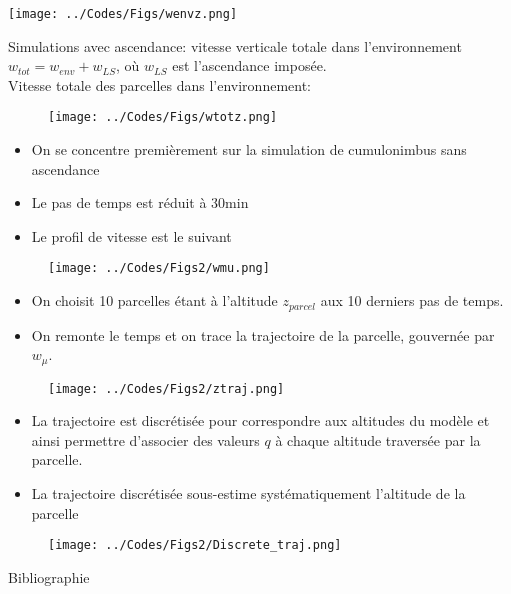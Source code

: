 \documentclass[10pt]{beamer}
\begin{document}
\begin{frame}{\secname}
    \centering
    \texttt{[image: ../Codes/Figs/wenvz.png]}
\end{frame}

\begin{frame}{\secname}
    Simulations avec ascendance: vitesse verticale totale dans l'environnement $w_{tot} = w_{env} + w_{LS}$, où $w_{LS}$ est l'ascendance imposée. \\
    Vitesse totale des parcelles dans l'environnement:
    
    \begin{figure}[hbtp]
        \centering
        \texttt{[image: ../Codes/Figs/wtotz.png]}
    \end{figure}
\end{frame}

\begin{frame}{\secname}
    \begin{itemize}
        \item On se concentre premièrement sur la simulation de cumulonimbus sans ascendance
        \item Le pas de temps est réduit à 30min
        \item Le profil de vitesse est le suivant
    \end{itemize}
    \begin{figure}[hbtp]
        \centering
        \texttt{[image: ../Codes/Figs2/wmu.png]}
    \end{figure}
\end{frame}

\begin{frame}{\secname}
    \begin{itemize}
        \item On choisit 10 parcelles étant à l'altitude $z_{parcel}$ aux 10 derniers pas de temps. 
        \item On remonte le temps et on trace la trajectoire de la parcelle, gouvernée par $w_{\mu}$.
    \end{itemize}
    \begin{figure}[hbtp]
        \centering
        \texttt{[image: ../Codes/Figs2/ztraj.png]}
    \end{figure}
\end{frame}

\begin{frame}{\secname}
    \begin{itemize}
        \item La trajectoire est discrétisée pour correspondre aux altitudes du modèle et ainsi permettre d'associer des valeurs $q$ à chaque altitude traversée par la parcelle. 
        \item La trajectoire discrétisée sous-estime systématiquement l'altitude de la parcelle
    \end{itemize}
    \begin{figure}[hbtp]
        \centering
        \texttt{[image: ../Codes/Figs2/Discrete\_traj.png]}
    \end{figure}
\end{frame}

\begin{frame}[allowframebreaks]{Bibliographie}
    \printbibliography
\end{frame}
\end{document}
